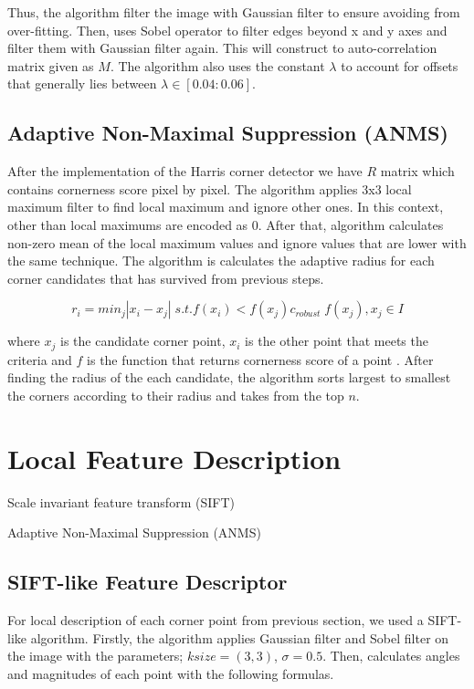 \documentclass[a4paper]{article}
\begin{document}
Thus, the algorithm filter the image with Gaussian filter to ensure avoiding from over-fitting. Then, uses Sobel operator to filter edges beyond x and y axes and filter them with Gaussian filter again. This will construct to auto-correlation matrix given as $M$. The algorithm also uses the constant $\lambda$ to account for offsets that generally lies between $ \lambda \in[0.04:0.06]$.

\subsection{Adaptive Non-Maximal Suppression (ANMS)}

After the implementation of the Harris corner detector we have $R$ matrix which contains cornerness score pixel by pixel. The algorithm applies 3x3 local maximum filter to find local maximum and ignore other ones. In this context, other than local maximums are encoded as 0. After that, algorithm calculates non-zero mean of the local maximum values and ignore values that are lower with the same technique. The algorithm is calculates the adaptive radius for each corner candidates that has survived from previous steps.

\begin{equation}
    r_i= min_j|x_i-x_j| \; s.t. f(x_i) < f(x_j)c_{robust} \; f(x_j),x_j\in{I}
\end{equation}

where $x_j$ is the candidate corner point, $x_i$ is the other point that meets the criteria and $f$ is the function that returns cornerness score of a point \cite{brown2005multi}. After finding the radius of the each candidate, the algorithm sorts largest to smallest the corners according to their radius and takes from the top $n$.

\section{Local Feature Description}

\textbullet{} Scale invariant feature transform (SIFT)

\textbullet{} Adaptive Non-Maximal Suppression (ANMS)

\subsection{SIFT-like Feature Descriptor}

For local description of each corner point from previous section, we used a SIFT-like algorithm. Firstly, the algorithm applies Gaussian filter and Sobel filter on the image with the parameters; $ksize=(3,3)$, $\sigma = 0.5$. Then, calculates angles and magnitudes of each point with the following formulas.
\end{document}
